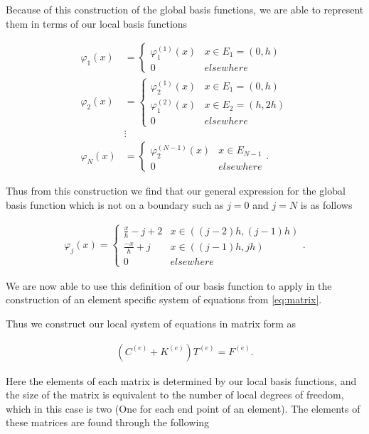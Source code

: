 \documentclass[10pt]{amsart}
\numberwithin{equation}{section}
\theoremstyle{definition}
\begin{document}
\begin{multicols}{2}
Because of this construction of the global basis functions, we are able to
represent them in terms of our local basis functions

\begin{align*}
  \varphi_1(x)&=\begin{cases}
    \varphi_1^{(1)}(x) & x\in E_1=(0,h)\\
    0 & elsewhere
  \end{cases}\\
  \varphi_2(x)&=\begin{cases}
    \varphi_2^{(1)}(x) & x\in E_1=(0,h)\\
    \varphi_1^{(2)}(x) & x\in E_2=(h,2h)\\
    0 & elsewhere
  \end{cases}\\
              & \vdots \\
  \varphi_N(x)&=\begin{cases}
    \varphi_2^{(N-1)}(x) & x\in E_{N-1}\\
    0 & elsewhere
  \end{cases}.
\end{align*}

Thus from this construction we find that our general expression for the global
basis function which is not on a boundary such as $j=0$ and $j=N$ is as follows

\begin{align}
  \varphi_j(x)=\begin{cases}
    \frac{x}{h}-j+2 & x \in ((j-2)h,(j-1)h)\\
    \frac{-x}{h}+j & x \in ((j-1)h,jh)\\
    0 & elsewhere
  \end{cases}.
\end{align}

We are now able to use this definition of our basis function to apply in the
construction of an element specific system of equations from \eqref{eq:matrix}.

Thus we construct our local system of equations in matrix form as

\begin{align}
  \left(C^{(e)}+K^{(e)}\right)T^{(e)}=F^{(e)}.
\end{align}

Here the elements of each matrix is determined by our local basis functions, and
the size of the matrix is equivalent to the number of local degrees of freedom,
which in this case is two (One for each end point of an element). The elements
of these matrices are found through the following


\end{multicols}
\end{document}
